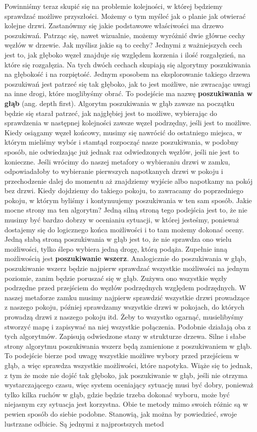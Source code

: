 Powinniśmy teraz skupić się na problemie kolejności, w której będziemy sprawdzać możliwe przyszłości. Możemy o tym myśleć jak o planie jak otwierać kolejne drzwi. Zastanówmy się jakie podstawowe właściwości ma drzewo poszukiwań. Patrząc się, nawet wizualnie, możemy wyróżnić dwie główne cechy węzłów w drzewie. Jak myślisz jakie są to cechy? Jednymi z ważniejszych cech jest to, jak głęboko węzeł znajduje się względem korzenia i ilość rozgałęzień, na które się rozgałęzia. Na tych dwóch cechach skupiają się algorytmy poszukiwania na głębokość i na rozpiętość. Jednym sposobem na eksplorowanie takiego drzewa poszukiwań jest patrzeć się tak głęboko, jak to jest możliwe, nie zwracając uwagi na inne drogi, które moglibyśmy obrać. To podejście ma nazwę \textbf{poszukiwania w głąb} (ang. depth first). Algorytm poszukiwania w głąb zawsze na początku będzie się starał patrzeć, jak najgłębiej jest to możliwe, wybierając do sprawdzenia w następnej kolejności zawsze węzeł podrzędny, jeśli jest to możliwe. Kiedy osiągamy węzeł końcowy, musimy się nawrócić do ostatniego miejsca, w którym mieliśmy wybór i stamtąd rozpocząć nasze poszukiwania, w podobny sposób, nie odwiedzając już jednak raz odwiedzonych węzłów, jeśli nie jest to konieczne. Jeśli wrócimy do naszej metafory o wybieraniu drzwi w zamku, odpowiadałoby to wybieranie pierwszych napotkanych drzwi w pokoju i przechodzenie dalej do momentu aż znajdziemy wyjście albo napotkamy na pokój bez drzwi. Kiedy dojdziemy do takiego pokoju, to zawracamy do poprzedniego pokoju, w którym byliśmy i kontynuujemy poszukiwania w ten sam sposób. Jakie mocne strony ma ten algorytm? Jedną silną stroną tego podejścia jest to, że nie musimy być bardzo dobrzy w ocenianiu sytuacji, w której jesteśmy, ponieważ dostajemy się do logicznego końca możliwości i to tam możemy dokonać oceny. Jedną słabą stroną poszukiwania w głąb jest to, że nie sprawdza ono wielu możliwości, tylko ślepo wybiera jedną drogę, którą podąża. Zupełnie inną możliwością jest \textbf{poszukiwanie wszerz}. Analogicznie do poszukiwania w głąb, poszukiwanie wszerz będzie najpierw sprawdzać wszystkie możliwości na jednym poziomie, zanim będzie poruszać się w głąb. Zużywa ono wszystkie węzły podrzędne przed przejściem do węzłów podrzędnych względem podrzędnych. W naszej metaforze zamku musimy najpierw sprawdzić wszystkie drzwi prowadzące z naszego pokoju, później sprawdzamy wszystkie drzwi w pokojach, do których prowadzą drzwi z naszego pokoju itd. Żeby to wszystko ogarnąć, musielibyśmy stworzyć mapę i zapisywać na niej wszystkie połączenia. Podobnie działają oba z tych algorytmów. Zapisują odwiedzone stany w strukturze drzewa. Silne i słabe strony algorytmu poszukiwania wszerz będą zamienione z poszukiwaniem w głąb. To podejście bierze pod uwagę wszystkie możliwe wybory przed przejściem w głąb, a więc sprawdza wszystkie możliwości, które napotyka. Wiąże się to jednak, z tym że może nie dojść tak głęboko, jak poszukiwanie w głąb, jeśli nie otrzyma wystarczającego czasu, więc system oceniający sytuację musi być dobry, ponieważ tylko kilka ruchów w głąb, gdzie będzie trzeba dokonać wyboru, może być niejasnym czy sytuacja jest korzystna. Obie te metody mimo swoich różnic są w pewien sposób do siebie podobne. Stanowią, jak można by powiedzieć, swoje lustrzane odbicie. Są jednymi z najprostszych metod 